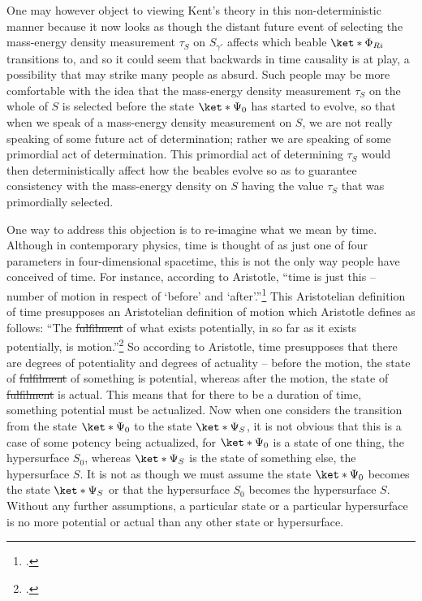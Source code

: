 \documentclass[12pt]{report}
\providecommand{\DIFadd}[1]{{\protect\color{blue}\uwave{#1}}} %
\providecommand{\DIFdel}[1]{{\protect\color{red}\sout{#1}}}                      %
\providecommand{\DIFaddbegin}{} %
\providecommand{\DIFaddend}{} %
\providecommand{\DIFdelbegin}{} %
\providecommand{\DIFdelend}{} %
\begin{document}
One may however object to viewing Kent's theory in this non-deterministic manner because it now looks as though the distant future event of selecting the mass-energy density measurement $\tau_S$  on $S_{\gamma'}$ affects which beable $\ket*{\Phi_{Ri}}$ transitions to, and so it could seem that backwards in time causality is at play, a possibility that may strike many people as absurd. Such people may be more comfortable with the idea that the mass-energy density measurement $\tau_S$ on the whole of $S$ is selected before the state $\ket*{\Psi_0}$ has started to evolve, so that when we speak of a mass-energy density measurement on $S$, we are not really speaking of some future act of determination; rather we are speaking of some primordial act of determination. This primordial act of determining $\tau_S$ would then deterministically affect how the beables evolve so as to guarantee consistency with the mass-energy density on $S$ having the value $\tau_S$ that was primordially selected.

One way to address this objection is to re-imagine what we mean by time. Although in contemporary physics, time is thought of as just one of four parameters in four-dimensional spacetime, this is not the only way people have conceived of time. For instance, according to Aristotle, ``time is just this -- number of motion in respect of `before' and `after'.''\footnote{\cite[ Book IV. Chapter 11 (219b 1-5)]{AristotlePhysics}.} This Aristotelian definition of time presupposes an Aristotelian definition of motion which Aristotle defines as follows: ``The \DIFdelbegin \DIFdel{fulfilment }\DIFdelend \DIFaddbegin \DIFadd{fulfillment }\DIFaddend of what exists potentially, in so far as it exists potentially, is motion.''\footnote{\cite[ Book III. Chapter 1 (201a10)]{AristotlePhysics}.} So according to Aristotle, time presupposes that there are degrees of potentiality and degrees of actuality -- before the motion, the state of \DIFdelbegin \DIFdel{fulfilment }\DIFdelend \DIFaddbegin \DIFadd{fulfillment }\DIFaddend of something is potential, whereas after the motion, the state of \DIFdelbegin \DIFdel{fulfilment }\DIFdelend \DIFaddbegin \DIFadd{fulfillment }\DIFaddend is actual. This means that for there to be a duration of time, something potential must be actualized. Now when one considers the transition from the state $\ket*{\Psi_0}$ to the state  $\ket*{\Psi_S}$, it is not obvious that this is a case of some potency being actualized, for $\ket*{\Psi_0}$ is a state of one thing, the hypersurface $S_0$,  whereas $\ket*{\Psi_S}$ is the state of something else, the hypersurface $S$. It is not as though we must assume the state $\ket*{\Psi_0}$ becomes the state $\ket*{\Psi_S}$ or that the hypersurface $S_0$ becomes the hypersurface $S$. Without any further assumptions, a particular state or a particular hypersurface is no more potential or actual than any other state or hypersurface. 
\end{document}
